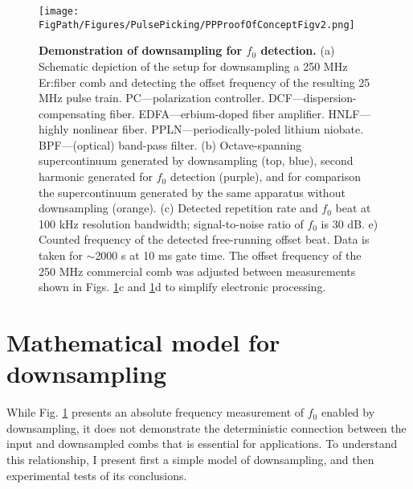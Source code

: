 \begin{figure}[htpb]
	\begin{center}
		\texttt{[image: \\FigPath/Figures/PulsePicking/PPProofOfConceptFigv2.png]}
	\end{center}
	\caption[Demonstration of downsampling for $f_0$ detection]{\textbf{Demonstration of downsampling for $f_0$ detection.} (a) Schematic depiction of the setup for downsampling a 250 MHz Er:fiber comb and detecting the offset frequency of the resulting 25 MHz pulse train. PC---polarization controller.  DCF---dispersion-compensating fiber. EDFA---erbium-doped fiber amplifier. HNLF---highly nonlinear fiber. PPLN---periodically-poled lithium niobate. BPF---(optical) band-pass filter. (b) Octave-spanning supercontinuum generated by downsampling (top, blue), second harmonic generated for $f_0$ detection (purple), and for comparison the supercontinuum generated by the same apparatus without downsampling (orange). (c) Detected repetition rate and $f_0$ beat at 100 kHz resolution bandwidth; signal-to-noise ratio of $f_0$ is 30 dB. e) Counted frequency of the detected free-running offset beat. Data is taken for $\sim$2000 s at 10 ms gate time. The offset frequency of the 250 MHz commercial comb was adjusted between measurements shown in Figs. \ref{fig:PPDemo}c and \ref{fig:PPDemo}d to simplify electronic processing.}
	\label{fig:PPDemo}
\end{figure} 



\section{Mathematical model for downsampling}\label{sec:PPMath}
While Fig. \ref{fig:PPDemo} presents an absolute frequency measurement of $f_0$ enabled by downsampling, it does not demonstrate the deterministic connection between the input and downsampled combs that is essential for applications. To understand this relationship, I present first a simple model of downsampling, and then experimental tests of its conclusions.

